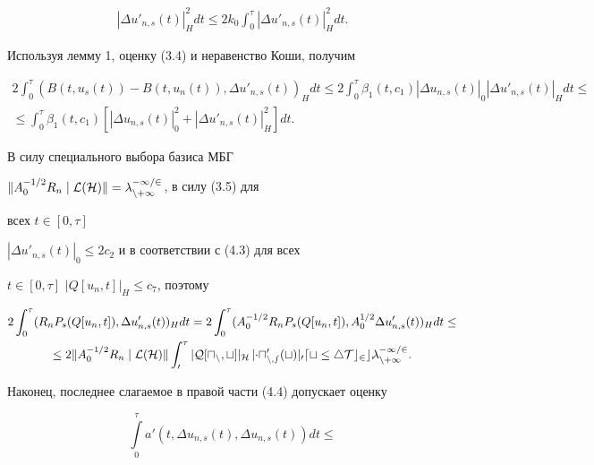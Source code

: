 \begin{pf}
\begin{multline}
|\Delta u'_{n,s}(t)|^2_H dt \le 2k_0\int^\tau_0 


|\Delta u'_{n,s}(t)|^2_H dt. 


\end{multline} 


Используя лемму 1, оценку (3.4) и неравенство Коши, получим 


\begin{multline} 


2\int^\tau_0(B(t,u_s(t))-B(t,u_n(t)), 


\Delta u'_{n,s}(t))_H dt \le 2\int^\tau_0 \beta_1(t,c_1) 


|\Delta u_{n,s}(t)|_0|\Delta u'_{n,s}(t)|_H dt \le \\ 


% 


\le\int^\tau_0\beta_1(t,c_1)[|\Delta u_{n,s}(t)|^2_0+ 


|\Delta u'_{n,s}(t)|^2_H]dt. 


\end{multline} 


В силу специального выбора базиса МБГ\; 


$\|A^{-1/2}_0R_n\mid\cal L(H)\|=\lambda^{-1/2}_{n+1}$, в силу (3.5) для 


всех $t\in[0,\tau]$\; 


$|\Delta u'_{n,s}(t)|_0\le 2c_2$ и в соответствии с (4.3) для всех 


$t\in[0,\tau]$\; $|Q[u_n,t]|_H\le c_7$, поэтому 


\begin{multline} 


2\int^\tau_0(R_n P_s(Q[u_n,t]),\Delta u'_{n,s}(t))_H dt= 


2\int^\tau_0(A^{-1/2}_0R_n P_s(Q[u_n,t]), 


A^{1/2}_0\Delta u'_{n,s}(t))_H dt \le \\ 


% 


\le 2\|A^{-1/2}_0R_n\mid\cal L(H)\|\int^\tau_0 


|Q[u_n,t]|_H\,|\Delta u'_{n,s}(t)|_0 dt\le 


4T c_2c_7\lambda^{-1/2}_{n+1}. 


\end{multline} 


Наконец, последнее слагаемое в правой части (4.4) допускает оценку 


\begin{equation} 


\int\limits^\tau_0 a'(t,\Delta u_{n,s}(t),\Delta u_{n,s}(t))dt\le 



\end{equation}
\end{pf}
